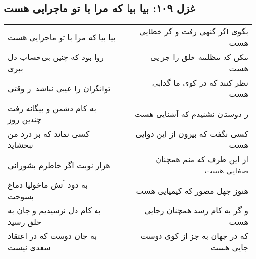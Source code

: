 \begin{center}
\section*{غزل ۱۰۹: بیا بیا که مرا با تو ماجرایی هست}
\label{sec:109}
\begin{longtable}{l p{0.5cm} r}
بیا بیا که مرا با تو ماجرایی هست
&&
بگوی اگر گنهی رفت و گر خطایی هست
\\
روا بود که چنین بی‌حساب دل ببری
&&
مکن که مظلمه خلق را جزایی هست
\\
توانگران را عیبی نباشد ار وقتی
&&
نظر کنند که در کوی ما گدایی هست
\\
به کام دشمن و بیگانه رفت چندین روز
&&
ز دوستان نشنیدم که آشنایی هست
\\
کسی نماند که بر درد من نبخشاید
&&
کسی نگفت که بیرون از این دوایی هست
\\
هزار نوبت اگر خاطرم بشورانی
&&
از این طرف که منم همچنان صفایی هست
\\
به دود آتش ماخولیا دماغ بسوخت
&&
هنوز جهل مصور که کیمیایی هست
\\
به کام دل نرسیدیم و جان به حلق رسید
&&
و گر به کام رسد همچنان رجایی هست
\\
به جان دوست که در اعتقاد سعدی نیست
&&
که در جهان به جز از کوی دوست جایی هست
\\
\end{longtable}
\end{center}
